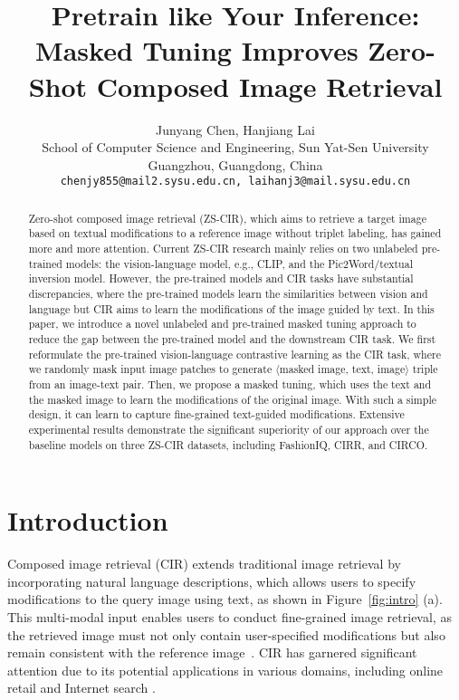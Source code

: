 \documentclass[10pt,twocolumn,letterpaper]{article}
\title{Pretrain like Your Inference: Masked Tuning Improves Zero-Shot Composed Image Retrieval}
\author{Junyang Chen, Hanjiang Lai\\
School of Computer Science and Engineering, Sun Yat-Sen University\\
Guangzhou, Guangdong, China\\
{\tt\small chenjy855@mail2.sysu.edu.cn, laihanj3@mail.sysu.edu.cn}
}
\begin{document}
\maketitle

\begin{abstract}
    Zero-shot composed image retrieval (ZS-CIR), which aims to retrieve a target image based on textual modifications to a reference image without triplet labeling, has gained more and more attention. Current ZS-CIR research mainly relies on two unlabeled pre-trained models:  the vision-language model, e.g., CLIP, and the Pic2Word/textual inversion model. However, the pre-trained models and CIR tasks have substantial discrepancies, where the pre-trained models learn the similarities between vision and language but CIR aims to learn the modifications of the image guided by text. In this paper, we introduce a novel unlabeled and pre-trained masked tuning approach to reduce the gap between the pre-trained model and the downstream CIR task. We first reformulate the pre-trained vision-language contrastive learning as the CIR task, where we randomly mask input image patches to generate $\langle$masked image, text, image$\rangle$ triple from an image-text pair. Then, we propose a masked tuning, which uses the text and the masked image to learn the modifications of the original image. With such a simple design, it can learn to capture fine-grained text-guided modifications. Extensive experimental results demonstrate the significant superiority of our approach over the baseline models on three ZS-CIR datasets, including FashionIQ, CIRR, and CIRCO.
\end{abstract}

\section{Introduction}

Composed image retrieval (CIR) \cite{baldrati2022effective, liu2021image, lee2021cosmo} extends traditional image retrieval by incorporating natural language descriptions, which allows users to specify modifications to the query image using text, as shown in Figure~\ref{fig:intro} (a). This multi-modal input enables users to conduct fine-grained image retrieval, as the retrieved image must not only contain user-specified modifications but also remain consistent with the reference image~\cite{vo2019composing}. CIR has garnered significant attention due to its potential applications in various domains, including online retail and Internet search \cite{jandial2022sac, wu2021fashion}.
\end{document}
